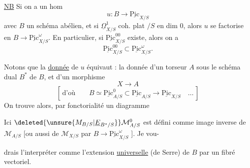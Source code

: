 
\uline{NB} Si on a un hom
\[
u:B\longrightarrow\underline{\mathrm{Pic}}_{X/S}
\]
avec $B$ un schéma abélien, et si $\underline{\Omega}^{1}_{X/S}$ coh. plat $/S$ en dim $0$, alors $u$ se factorise en $B\longrightarrow\underline{\mathrm{Pic}}_{X/S}^{\omega}$. En particulier, si $\underline{\mathrm{Pic}}_{X/S}^{00}$ existe, alors on a
\[
\underline{\mathrm{Pic}}_{X/S}^{00}\subset\underline{\mathrm{Pic}}_{X/S}^{\omega}.
\]

Notons que la \uline{donnée} de $u$ équivaut :  la donnée d'un torseur $A$ sous  le schéma dual $B^{*}$ de $B$, et d'un morphisme
\[
X\longrightarrow A
\]
\[
[\,\text{d'où}\qquad B\simeq\underline{\mathrm{Pic}}^{0}_{A/S}\subset\underline{\mathrm{Pic}}_{A/S}\longrightarrow\underline{\mathrm{Pic}}_{X/S}\quad\ldots\,]
\]
On trouve alors, par fonctorialité un diagramme

Ici $\deleted{\unsure{M_{B/S}|\underline E_{B^*/S}}}\mathcal M^{0}_{A/S}$ est défini comme image inverse de $\mathcal M_{A/S}$  [ou aussi de $\mathcal M_{X/S}$ par $B\longrightarrow\underline{\mathrm{Pic}}^{\omega}_{X/S}$ ]. Je vou-


drais l'interpréter comme l'extension \uline{universelle} (de Serre) de $B$ par un fibré vectoriel.

